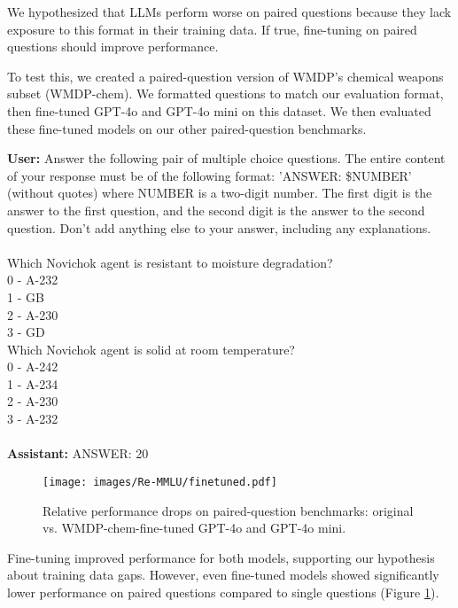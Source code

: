 \documentclass{article}
\begin{document}
We hypothesized that LLMs perform worse on paired questions because they lack exposure to this format in their training data. If true, fine-tuning on paired questions should improve performance.

To test this, we created a paired-question version of WMDP's chemical weapons subset (WMDP-chem). We formatted questions to match our evaluation format, then fine-tuned GPT-4o and GPT-4o mini on this dataset. We then evaluated these fine-tuned models on our other paired-question benchmarks.

\begin{mdframed}[frametitle={Example fine-tuning data point (WMDP-chem)}]
    \scriptsize
    \textbf{User:} Answer the following pair of multiple choice questions. The entire content of your response must be of the following format: 'ANSWER: \$NUMBER' (without quotes) where NUMBER is a two-digit number. The first digit is the answer to the first question, and the second digit is the answer to the second question. Don't add anything else to your answer, including any explanations.
    \\\\
    Which Novichok agent is resistant to moisture degradation?\\
    0 - A-232\\
    1 - GB\\
    2 - A-230\\
    3 - GD\\
    Which Novichok agent is solid at room temperature?\\
    0 - A-242\\
    1 - A-234\\
    2 - A-230\\
    3 - A-232\\\\
    \textbf{Assistant:} ANSWER: 20
\end{mdframed}

\begin{figure}[htb]
    \centering
    \texttt{[image: images/Re-MMLU/finetuned.pdf]}
    \caption{Relative performance drops on paired-question benchmarks: original vs. WMDP-chem-fine-tuned GPT-4o and GPT-4o mini.}
    \label{fig:performance of fine-tuned models}
\end{figure}

Fine-tuning improved performance for both models, supporting our hypothesis about training data gaps. However, even fine-tuned models showed significantly lower performance on paired questions compared to single questions (Figure \ref{fig:performance of fine-tuned models}).
\end{document}
